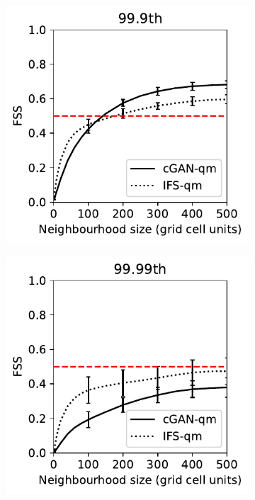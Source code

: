 \documentclass[../main.tex]{subfiles}
\begin{document}
\begin{figure}[t]
\begin{subfigure}[t]{0.32\textwidth}
     \caption{}
     \end{subfigure}
     \begin{subfigure}[t]{0.32\textwidth}
     \includegraphics[width=\textwidth]{images/fss_q99.9th_final-nologs_217600.pdf}
     \caption{}
     \end{subfigure}
     \begin{subfigure}[t]{0.32\textwidth}
     \includegraphics[width=\textwidth]{images/fss_q99.99th_final-nologs_217600.pdf}

\end{subfigure}
\end{figure}
\end{document}
